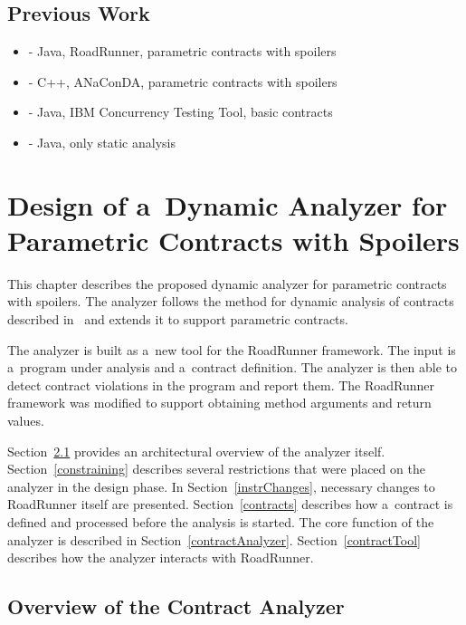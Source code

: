 \section{Previous Work}


\begin{itemize}
    \item \cite{janousek} - Java, RoadRunner, parametric contracts with spoilers
    \item \cite{contracts} - C++, ANaConDA, parametric contracts with spoilers
    \item \cite{FITPUB10817} - Java, IBM Concurrency Testing Tool, basic
        contracts
    \item \cite{DBLP:journals/corr/SousaDFL15} - Java, only static analysis
\end{itemize}



\chapter{Design of a~Dynamic Analyzer for Parametric Contracts with Spoilers}
\label{chFour}

This chapter describes the proposed dynamic analyzer for parametric contracts
with spoilers. The analyzer follows the method for dynamic analysis of contracts
described in~\cite{contracts} and extends it to support parametric contracts.

The analyzer is built as a~new tool for the RoadRunner framework. The input is
a~program under analysis and a~contract definition. The analyzer is then able to
detect contract violations in the program and report them. The RoadRunner
framework was modified to support obtaining method arguments and return values.

Section~\ref{overview} provides an architectural overview of the analyzer
itself. Section~\ref{constraining} describes several restrictions that were
placed on the analyzer in the design phase. In Section~\ref{instrChanges},
necessary changes to RoadRunner itself are presented. Section~\ref{contracts}
describes how a~contract is defined and processed before the analysis is
started. The core function of the analyzer is described in
Section~\ref{contractAnalyzer}. Section~\ref{contractTool} describes how the
analyzer interacts with RoadRunner.

\section{Overview of the Contract Analyzer}
\label{overview}


